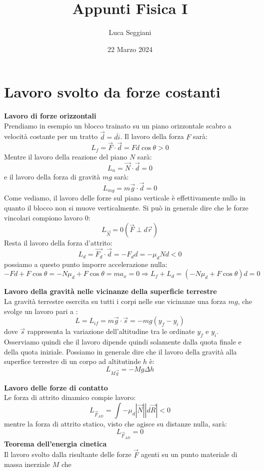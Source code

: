 \documentclass[a4paper,12pt]{article}
\title{Appunti Fisica I}
\author{Luca Seggiani}
\date{22 Marzo 2024}
\begin{document}
\maketitle
\section{Lavoro svolto da forze costanti}
\par\smallskip
\textbf{Lavoro di forze orizzontali} \\
Prendiamo in esempio un blocco trainato su un piano orizzontale scabro a velocità costante per un tratto $\vec{d} = d\hat{i}$. Il lavoro della forza $F$ sarà:
$$ L_f = \vec{F} \cdot \vec{d} = F d \cos{\theta} > 0 $$
Mentre il lavoro della reazione del piano $N$ sarà:
$$ L_n = \vec{N} \cdot \vec{d} = 0$$
e il lavoro della forza di gravità $mg$ sarà:
$$ L_{mg} = m\vec{g} \cdot \vec{d} = 0 $$
Come vediamo, il lavoro delle forze sul piano verticale è effettivamente nullo in quanto il blocco non si muove verticalmente.
Si può in generale dire che le forze vincolari compiono lavoro 0:
$$ L_{\vec{N}} = 0(\vec{F} \perp d\vec{r})$$
Resta il lavoro della forza d'attrito:
$$ L_{d} = \vec{F_d} \cdot \vec{d} = -F_dd = -\mu_d N d < 0 $$
possiamo a questo punto imporre accelerazione nulla:
$$ -Fd + F\cos{\theta} = -N\mu_d + F\cos{\theta} = ma_x = 0 \Rightarrow L_f + L_d = (-N\mu_d + F\cos{\theta})d = 0$$
\par\smallskip
\textbf{Lavoro della gravità nelle vicinanze della superficie terrestre} \\
La gravità terrestre esercita su tutti i corpi nelle sue vicinanze una forza $mg$, che svolge un lavoro pari a :
$$ L = L_{if} = m\vec{g} \cdot \vec{s} = -mg(y_f-y_i) $$
dove $\vec{s}$ rappresenta la variazione dell'altitudine tra le ordinate $y_f$ e $y_i$. Osserviamo quindi che il 
lavoro dipende quindi solamente dalla quota finale e della quota iniziale. Possiamo in generale dire che
il lavoro della gravità alla superfice terrestre di un corpo ad altitutinde $h$ è:
$$ L_{M\vec{g}} = -Mg\Delta h$$
\par\smallskip
\textbf{Lavoro delle forze di contatto} \\
Le forza di attrito dinamico compie lavoro:
$$ L_{\vec{F}_{AD}} = \int -\mu_d|\vec{N}||d\vec{R}| < 0 $$
mentre la forza di attrito statico, visto che agisce su distanze nulla, sarà:
$$ L_{\vec{F}_{AD}} = 0 $$
\textbf{Teorema dell'energia cinetica} \\
Il lavoro svolto dalla risultante delle forze $\vec{F}$ agenti su un punto materiale di massa inerziale $M$ che
\end{document}
